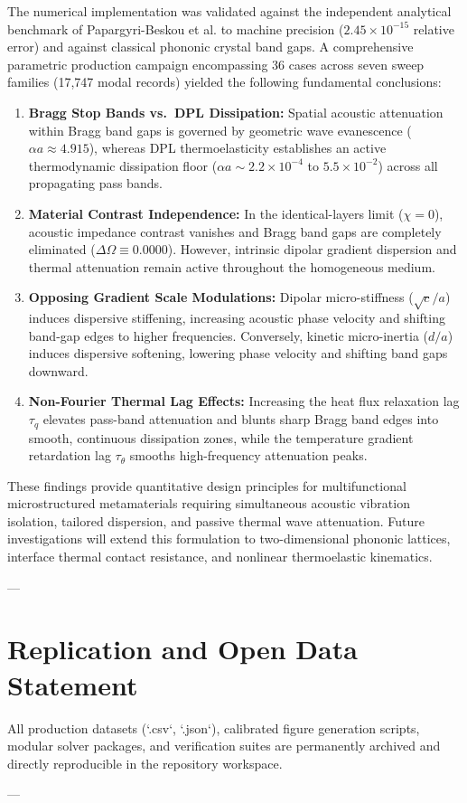 \documentclass[11pt,a4paper]{article}
\begin{document}
The numerical implementation was validated against the independent analytical benchmark of Papargyri-Beskou et al. \cite{papargyribeskou2009wave} to machine precision ($2.45 \times 10^{-15}$ relative error) and against classical phononic crystal band gaps. A comprehensive parametric production campaign encompassing 36 cases across seven sweep families (17,747 modal records) yielded the following fundamental conclusions:
\begin{enumerate}
    \item \textbf{Bragg Stop Bands vs.\ DPL Dissipation:} Spatial acoustic attenuation within Bragg band gaps is governed by geometric wave evanescence ($\alpha a \approx 4.915$), whereas DPL thermoelasticity establishes an active thermodynamic dissipation floor ($\alpha a \sim 2.2 \times 10^{-4}$ to $5.5 \times 10^{-2}$) across all propagating pass bands.
    \item \textbf{Material Contrast Independence:} In the identical-layers limit ($\chi = 0$), acoustic impedance contrast vanishes and Bragg band gaps are completely eliminated ($\Delta\Omega \equiv 0.0000$). However, intrinsic dipolar gradient dispersion and thermal attenuation remain active throughout the homogeneous medium.
    \item \textbf{Opposing Gradient Scale Modulations:} Dipolar micro-stiffness ($\sqrt{c}/a$) induces dispersive stiffening, increasing acoustic phase velocity and shifting band-gap edges to higher frequencies. Conversely, kinetic micro-inertia ($d/a$) induces dispersive softening, lowering phase velocity and shifting band gaps downward.
    \item \textbf{Non-Fourier Thermal Lag Effects:} Increasing the heat flux relaxation lag $\tau_q$ elevates pass-band attenuation and blunts sharp Bragg band edges into smooth, continuous dissipation zones, while the temperature gradient retardation lag $\tau_\theta$ smooths high-frequency attenuation peaks.
\end{enumerate}
These findings provide quantitative design principles for multifunctional microstructured metamaterials requiring simultaneous acoustic vibration isolation, tailored dispersion, and passive thermal wave attenuation. Future investigations will extend this formulation to two-dimensional phononic lattices, interface thermal contact resistance, and nonlinear thermoelastic kinematics.

---

\section*{Replication and Open Data Statement}
All production datasets (`.csv`, `.json`), calibrated figure generation scripts, modular solver packages, and verification suites are permanently archived and directly reproducible in the repository workspace.

---



\end{document}
